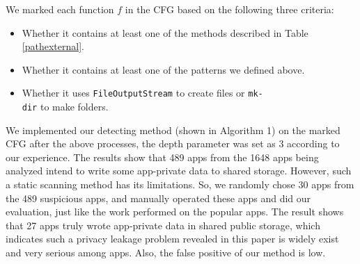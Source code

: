 \documentclass{sig-alternate}
\makeatletter
\newcommand{\tabincell}[2]{\begin{tabular}{@{}#1@{}}#2\end{tabular}}
\makeatother
\begin{document}
We marked each function $f$ in the CFG based on the following three criteria:

\begin{itemize}

 \item Whether it contains at least one of the methods described in Table \ref{pathexternal}.

 \item Whether it contains at least one of the patterns we defined above.

 \item Whether it uses \texttt{FileOutputStream} to create files or \texttt{mk-\\dir} to make folders.

\end{itemize}



\begin{table}[htb]
\centering
\caption{Methods of getting path of shared public storage}
\newsavebox{\tableboxz}
\label{pathexternal}
\scalebox{0.8}{\usebox{\tableboxz}}
\end{table}



We implemented our detecting method (shown in Algorithm 1) on the marked CFG after the above processes, the depth parameter was set as 3 according to our experience. The results show that 489 apps from the 1648 apps being analyzed intend to write some app-private data to shared storage. However, such a static scanning method has its limitations. So, we randomly chose 30 apps from the 489 suspicious apps, and manually operated these apps and did our evaluation, just like the work performed on the popular apps. The result shows that 27 apps truly wrote app-private data in shared public storage, which indicates such a privacy leakage problem revealed in this paper is widely exist and very serious among apps. Also, the false positive of our method is low.
\end{document}
